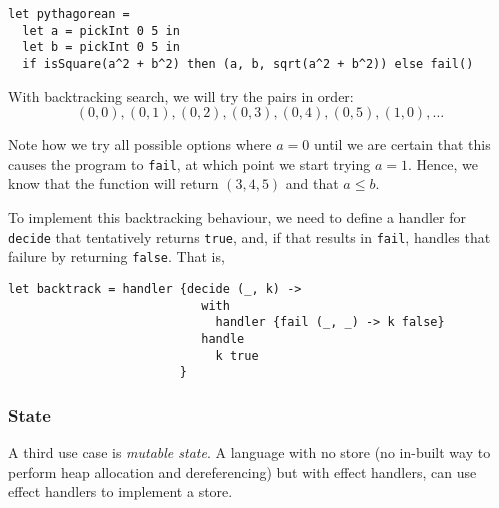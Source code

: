 \begin{verbatim}
let pythagorean =
  let a = pickInt 0 5 in
  let b = pickInt 0 5 in
  if isSquare(a^2 + b^2) then (a, b, sqrt(a^2 + b^2)) else fail()
\end{verbatim}

With backtracking search, we will try the pairs in order:
\[
     (0, 0), (0, 1), (0, 2), (0, 3), (0, 4), (0, 5), (1, 0),
     \ldots
\]

Note how we try all possible options where $a=0$ until we are certain that this causes the program to \texttt{fail}, at which point we start trying $a=1$. Hence, we know that the function will return $(3, 4, 5)$ and that $a \leq b$. 

To implement this backtracking behaviour, we need to define a handler for \texttt{decide} that tentatively returns \texttt{true}, and, if that results in \texttt{fail}, handles that failure by returning \texttt{false}. That is, 

\begin{verbatim}
let backtrack = handler {decide (_, k) -> 
                           with 
                             handler {fail (_, _) -> k false} 
                           handle 
                             k true
                        }
\end{verbatim}


\subsubsection{State}
A third use case is \textit{mutable state}. A language with no store (no in-built way to perform heap allocation and dereferencing) but with effect handlers, can use effect handlers to implement a store. 

